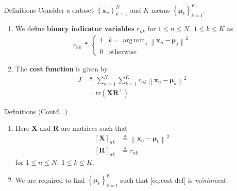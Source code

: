 \documentclass{beamer}
\DeclareMathOperator*{\argmin}{arg\,min}
\providecommand{\sbrak}[1]{\ensuremath{{}\left[#1\right]}}
\providecommand{\brak}[1]{\ensuremath{\left(#1\right)}}
\providecommand{\cbrak}[1]{\ensuremath{\left\{#1\right\}}}
\theoremstyle{remark}
\providecommand{\norm}[1]{\left\lVert#1\right\rVert}
\renewcommand{\vec}[1]{\mathbf{\boldsymbol{#1}}}
\begin{document}
\begin{frame}{Definitions}
    Consider a dataset $\cbrak{\vec{x}_n}_{n=1}^N$ and $K$ means
    $\cbrak{\vec{\mu}_k}_{k=1}^K$.
    \pause
    \begin{enumerate}
        \item We define \textbf{binary indicator variables} $r_{nk}$ for 
        $1 \le n \le N,\ 1 \le k \le K$ as
            \begin{align}
                r_{nk} \triangleq
                \begin{cases}
                    1 & k = \argmin_j\norm{\vec{x}_n-\vec{\mu}_j}^2 \\
                    0 & \textrm{otherwise}
                \end{cases}
                \label{eq:rnk-def}
            \end{align}
        \pause
        \item The \textbf{cost function} is given by
            \begin{align}
                J &\triangleq \sum_{n=1}^N\sum_{k=1}^Kr_{nk}\norm{\vec{x}_n-\vec{\mu}_{k}}^2 \\
                  &= \textrm{tr}\brak{\vec{XR}^\top}
                \label{eq:cost-def}
            \end{align}
    \end{enumerate}
\end{frame}

\begin{frame}{Definitions (Cont\'d...)}
    \begin{enumerate}
        \item Here $\vec{X}$ and $\vec{R}$ are matrices such that
            \begin{align}
                \sbrak{\vec{X}}_{nk} &\triangleq \norm{\vec{x}_n - \vec{\mu}_k}^2 \\
                \sbrak{\vec{R}}_{nk} &\triangleq r_{nk}
            \end{align}
            for $1\le n\le N,\ 1\le k\le K$.
        \pause
        \item We are required to find $\cbrak{\vec{\mu}_k}_{k=1}^K$ such that
        \eqref{eq:cost-def} is \textit{minimized}.
    \end{enumerate}
\end{frame}
\end{document}
